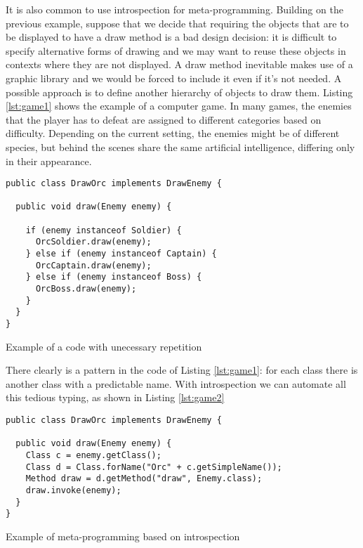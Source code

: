 It is also common to use introspection for meta-programming. Building on the previous example, suppose that we decide that
requiring the objects that are to be displayed to have a draw method is a bad design decision: it is difficult to specify
alternative forms of drawing and we may want to reuse these objects in contexts where they are not displayed. A draw method
inevitable makes use of a graphic library and we would be forced to include it even if it's not needed. A possible
approach is to define another hierarchy of objects to draw them. Listing \ref{lst:game1} shows the example of a computer game.
In many games, the enemies that the player has to defeat are assigned to different categories based on difficulty. Depending
on the current setting, the enemies might be of different species, but behind the scenes share the same artificial intelligence,
differing only in their appearance.

\begin{listing}[H]
\begin{verbatim}
public class DrawOrc implements DrawEnemy {

  public void draw(Enemy enemy) {
    
    if (enemy instanceof Soldier) {
      OrcSoldier.draw(enemy);
    } else if (enemy instanceof Captain) {
      OrcCaptain.draw(enemy);
    } else if (enemy instanceof Boss) {
      OrcBoss.draw(enemy);
    }
  }
} 
\end{verbatim}
\caption{Example of a code with unecessary repetition}
\label{lst:game1}
\end{listing}

There clearly is a pattern in the code of Listing \ref{lst:game1}: for each class there is another class with a predictable name. With introspection we
can automate all this tedious typing, as shown in Listing \ref{lst:game2}

\begin{listing}[H]
\begin{verbatim}
public class DrawOrc implements DrawEnemy {

  public void draw(Enemy enemy) {
    Class c = enemy.getClass();    
    Class d = Class.forName("Orc" + c.getSimpleName());    
    Method draw = d.getMethod("draw", Enemy.class);
    draw.invoke(enemy);
  }
}
\end{verbatim}
\caption{Example of meta-programming based on introspection}
\label{lst:game2}
\end{listing}


